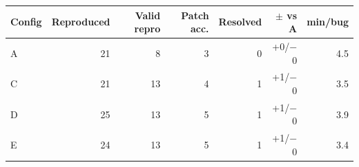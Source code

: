 \begin{tabular}{lrrrrrr}
\toprule
Config & Reproduced & Valid repro & Patch acc. & Resolved & $\pm$ vs A & min/bug \\
\midrule
A & 21 & 8 & 3 & 0 & +0/$-$0 & 4.5 \\
C & 21 & 13 & 4 & 1 & +1/$-$0 & 3.5 \\
D & 25 & 13 & 5 & 1 & +1/$-$0 & 3.9 \\
E & 24 & 13 & 5 & 1 & +1/$-$0 & 3.4 \\
\bottomrule
\end{tabular}
